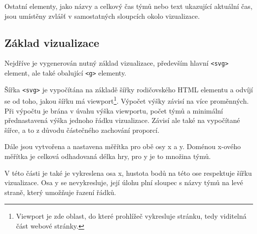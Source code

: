 \documentclass[
  digital, %
  oneside, %
  table,   %
  nolof,     %
  nolot,     %
]{fithesis3}
\begin{document}
Ostatní elementy, jako názvy a celkový čas týmů nebo text ukazující aktuální čas, jsou umístěny zvlášť v samostatných sloupcích okolo vizualizace.

\subsection{Základ vizualizace}
Nejdříve je vygenerován nutný základ vizualizace, především hlavní \verb|<svg>| element, ale také obalující \verb|<g>| elementy.\par
Šířka \verb|<svg>| je vypočítána na základě šířky rodičovského HTML elementu a odvíjí se od toho, jakou šířku má viewport\footnote{Viewport je zde oblast, do které prohlížeč vykresluje stránku, tedy viditelná část webové stránky.}. Výpočet výšky závisí na více proměnných. Při výpočtu je brána v úvahu výška viewportu, počet týmů a minimální přednastavená výška jednoho řádku vizualizace. Závisí ale také na vypočítané šířce, a to z důvodu částečného zachování proporcí.\par
Dále jsou vytvořena a nastavena měřítka pro obě osy x a y. Doménou x-ového měřítka je celková odhadovaná délka hry, pro y je to množina týmů.\par
V této části je také je vykreslena osa x, hustota bodů na této ose respektuje šířku vizualizace. Osa y se nevykresluje, její úlohu plní sloupec s názvy týmů na levé straně, který umožňuje řazení řádků.
\end{document}
